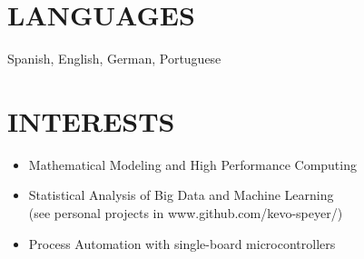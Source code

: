 \documentclass[margin]{res}
\begin{document}
\begin{resume}
 
\section{LANGUAGES}  Spanish, English, German, Portuguese 

\section{INTERESTS}        
       \begin{itemize}  \itemsep -2pt %
        \item	Mathematical Modeling and High Performance Computing 
	\item   Statistical Analysis of Big Data and Machine Learning \\ 
	    	(see personal projects in www.github.com/kevo-speyer/) 
    	\item	Process Automation with single-board microcontrollers 
       \end{itemize}
 


\end{resume}
\end{document}
